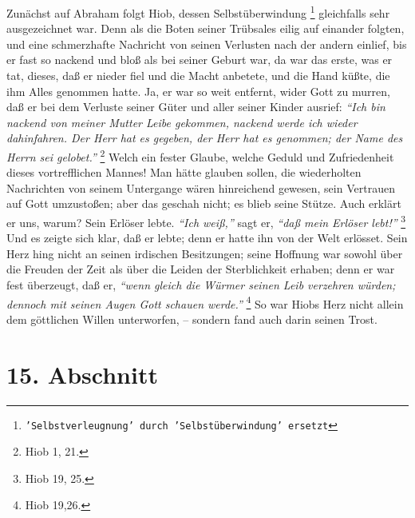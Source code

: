 Zunächst auf Abraham folgt Hiob,  dessen Selbstüberwindung
\footnote{\texttt{'Selbstverleugnung' durch 'Selbstüberwindung' ersetzt}} gleichfalls
sehr
ausgezeichnet war. Denn als die Boten seiner Trübsales eilig auf einander
folgten, und eine schmerzhafte Nachricht von seinen Verlusten nach der andern
einlief, bis er fast so nackend und bloß als bei seiner Geburt war, da war das
erste, was er tat, dieses, daß er nieder fiel und die Macht anbetete, und die
Hand küßte, die ihm Alles genommen hatte. Ja, er war so weit entfernt, wider
Gott zu murren, daß er bei dem Verluste seiner Güter und aller seiner Kinder
ausrief:
\textit{"`Ich bin nackend von meiner Mutter Leibe gekommen, nackend werde ich
wieder dahinfahren. Der Herr hat es gegeben, der Herr hat es genommen; der Name
des Herrn sei gelobet."'}
\footnote{Hiob 1, 21.}
Welch ein fester Glaube, welche
Geduld und Zufriedenheit dieses vortrefflichen Mannes! Man hätte glauben sollen,
die wiederholten Nachrichten von seinem Untergange wären hinreichend gewesen,
sein Vertrauen auf Gott umzustoßen; aber das geschah nicht; es blieb seine
Stütze. Auch erklärt er uns, warum? Sein Erlöser lebte.
\textit{"`Ich weiß,"'} sagt er,
\textit{"`daß mein Erlöser lebt!"'}
\footnote{Hiob 19, 25.}
Und es zeigte sich
klar, daß er lebte; denn er hatte ihn von der Welt erlösset. Sein Herz hing
nicht an seinen irdischen Besitzungen; seine Hoffnung war sowohl über die
Freuden der Zeit als über die Leiden der Sterblichkeit erhaben; denn er war fest
überzeugt, daß er,
\textit{"`wenn gleich die Würmer seinen Leib verzehren würden;
dennoch mit seinen Augen Gott schauen werde."'}
\footnote{Hiob 19,26.}
So war Hiobs
Herz nicht allein dem göttlichen Willen unterworfen, – sondern fand auch darin
seinen Trost. 

\section{15. Abschnitt} \label{kap4_ab15}

